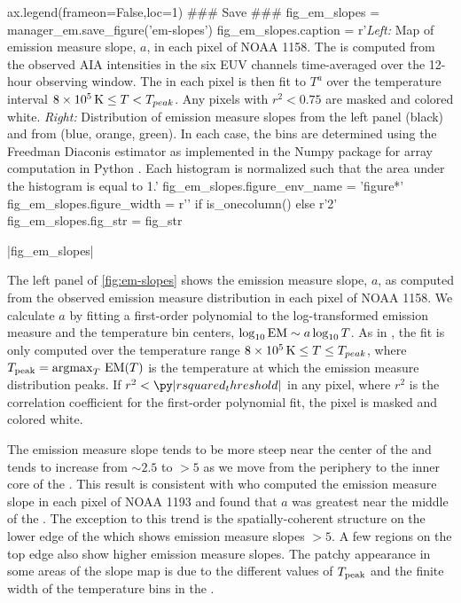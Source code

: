 \begin{pycode}[manager_em]
ax.legend(frameon=False,loc=1)
### Save ###
fig_em_slopes = manager_em.save_figure('em-slopes')
fig_em_slopes.caption = r'\textit{Left:} Map of emission measure slope, $a$, in each pixel of \AR{} NOAA 1158. The \dem{} is computed from the observed AIA intensities in the six EUV channels time-averaged over the 12-hour observing window. The \dem{} in each pixel is then fit to $T^a$ over the temperature interval $8\times10^5\,\textup{K}\le T < T_{peak}$. Any pixels with $r^2<0.75$ are masked and colored white. \textit{Right:} Distribution of emission measure slopes from the left panel (black) and from  (blue, orange, green). In each case, the bins are determined using the Freedman Diaconis estimator \citep{freedman_histogram_1981} as implemented in the Numpy package for array computation in Python \citep{oliphant_guide_2006}. Each histogram is normalized such that the area under the histogram is equal to 1.'
fig_em_slopes.figure_env_name = 'figure*'
fig_em_slopes.figure_width = r'\columnwidth' if is_onecolumn() else r'2\columnwidth'
fig_em_slopes.fig_str = fig_str
\end{pycode}
\py[manager_em]|fig_em_slopes|

The left panel of \autoref{fig:em-slopes} shows the emission measure slope, $a$, as computed from the observed emission measure distribution in each pixel of \AR{} NOAA 1158. We calculate $a$ by fitting a first-order polynomial to the log-transformed emission measure and the temperature bin centers, $\log_{10}\textup{EM}\sim a\log_{10}T$. As in , the fit is only computed over the temperature range $8\times10^5\,\textup{K}\le T \le T_{peak}$, where $T_\textup{peak}=\operatorname*{argmax}_T\,\textup{EM}(T)$ is the temperature at which the emission measure distribution peaks. If $r^2<\py|rsquared_threshold|$ in any pixel, where $r^2$ is the correlation coefficient for the first-order polynomial fit, the pixel is masked and colored white. 

The emission measure slope tends to be more steep near the center of the \AR{} and tends to increase from $\sim2.5$ to $>5$ as we move from the periphery to the inner core of the \AR{}. This result is consistent with \citet{del_zanna_evolution_2015} who computed the emission measure slope in each pixel of \AR{} NOAA 1193 and found that $a$ was greatest near the middle of the \AR{}. The exception to this trend is the spatially-coherent structure on the lower edge of the \AR{} which shows emission measure slopes $>5$. A few regions on the top edge also show higher emission measure slopes. The patchy appearance in some areas of the slope map is due to the different values of $T_\textup{peak}$ and the finite width of the temperature bins in the \dem.

